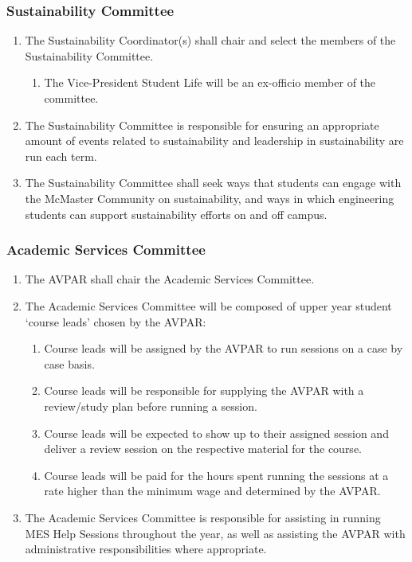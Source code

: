 \subsubsection{Sustainability Committee}
\label{sustainability-committee}
\begin{enumerate}
 \item
  The Sustainability Coordinator(s) shall chair and select the members of the Sustainability Committee.
  \begin{enumerate}
    \item The Vice-President Student Life will be an ex-officio member of the committee.
  \end{enumerate}
 \item
  The Sustainability Committee is responsible for ensuring an appropriate amount of events related to sustainability and leadership in sustainability are run each term.
 \item
  The Sustainability Committee shall seek ways that students can engage with the McMaster Community on sustainability, and ways in which engineering students can support sustainability efforts on and off campus.
\end{enumerate}

\subsubsection{Academic Services Committee}
\label{academic-services-committee}
\begin{enumerate}
 \item
  The AVPAR shall chair the Academic Services Committee.
 \item
  The Academic Services Committee will be composed of upper year student `course leads' chosen by the AVPAR:

  \begin{enumerate}
   \item
    Course leads will be assigned by the AVPAR to run sessions on a case by case basis.
   \item
    Course leads will be responsible for supplying the AVPAR with a review/study plan before running a session.
   \item
    Course leads will be expected to show up to their assigned session and deliver a review session on the respective material for the course.
   \item
    Course leads will be paid for the hours spent running the sessions at a rate higher than the minimum wage and determined by the AVPAR.
  \end{enumerate}
 \item
  The Academic Services Committee is responsible for assisting in running MES Help Sessions throughout the year, as well as assisting the AVPAR with administrative responsibilities where appropriate.

\end{enumerate}

